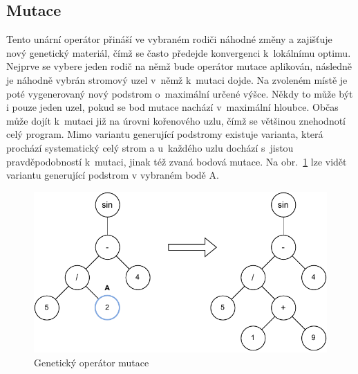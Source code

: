 \subsection{Mutace}

Tento unární operátor přináší ve vybraném rodiči náhodné změny a zajišťuje nový genetický materiál, čímž se často předejde konvergenci k~lokálnímu optimu. Nejprve se vybere jeden rodič na němž bude operátor mutace aplikován, následně je náhodně vybrán stromový uzel v~němž k~mutaci dojde. Na zvoleném místě je poté vygenerovaný nový podstrom o~maximální určené výšce. Někdy to může být i pouze jeden uzel, pokud se bod mutace nachází v~maximální hloubce. Občas může dojít k~mutaci již na úrovni kořenového uzlu, čímž se většinou znehodnotí celý program. Mimo variantu generující podstromy existuje varianta, která prochází systematický celý strom a u~každého uzlu dochází s~jistou pravděpodobností k~mutaci, jinak též zvaná bodová mutace. Na obr.~\ref{fig:tgp-mutation} lze vidět variantu generující podstrom v vybraném bodě A. 

\vspace{0.5cm}
\begin{figure}[h!]
    \centering
    \includegraphics[scale=1]{obrazky-figures/tgp-mutation.pdf}
    \caption{Genetický operátor mutace}
    \label{fig:tgp-mutation}
\end{figure}
\vspace{0.5cm}


